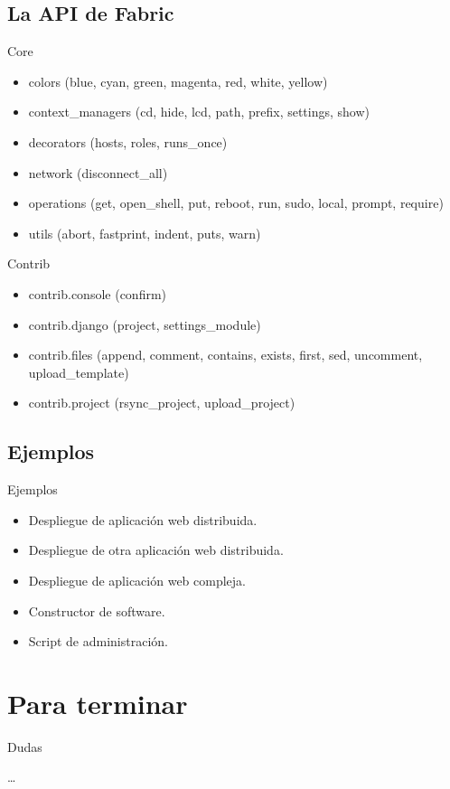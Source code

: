 \documentclass[10pt]{beamer}
\begin{document}
  \subsection*{La API de Fabric}
  \begin{frame}{Core}
    \begin{itemize}
      \item colors (blue, cyan, green, magenta, red, white, yellow)
      \item context\_managers (cd, hide, lcd, path, prefix, settings, show)
      \item decorators (hosts, roles, runs\_once)
      \item network (disconnect\_all)
      \item operations (get, open\_shell, put, reboot, run, sudo, local, prompt, require)
      \item utils (abort, fastprint, indent, puts, warn)
    \end{itemize}
  \end{frame}

  \begin{frame}{Contrib}
    \begin{itemize}
      \item contrib.console (confirm)
      \item contrib.django (project, settings\_module)
      \item contrib.files (append, comment, contains, exists, first, sed, uncomment, upload\_template)
      \item contrib.project (rsync\_project, upload\_project)
    \end{itemize}
  \end{frame}
  
  \subsection*{Ejemplos}
  \begin{frame}{Ejemplos}
    \begin{itemize}
      \item Despliegue de aplicación web distribuida.
      \item Despliegue de otra aplicación web distribuida.
      \item Despliegue de aplicación web compleja.
      \item Constructor de software.
      \item Script de administración.
    \end{itemize}
  \end{frame}

  \section*{Para terminar}

  \begin{frame}{Dudas}
    \begin{center}
      \dots
    \end{center}
  \end{frame}
\end{document}
